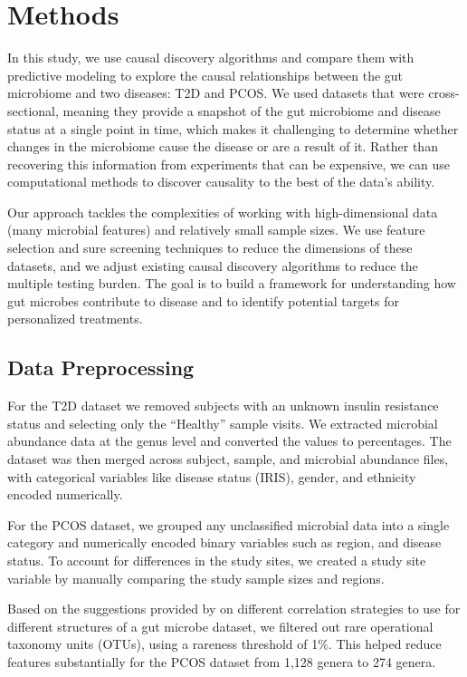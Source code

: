 \documentclass[12pt,letterpaper]{article}
\begin{document}
\section{Methods}

In this study, we use causal discovery algorithms and compare them with predictive modeling to explore the causal relationships between the gut microbiome and two diseases: T2D and PCOS. We used datasets that were cross-sectional, meaning they provide a snapshot of the gut microbiome and disease status at a single point in time, which makes it challenging to determine whether changes in the microbiome cause the disease or are a result of it. Rather than recovering this information from experiments that can be expensive, we can use computational methods to discover causality to the best of the data’s ability. 

Our approach tackles the complexities of working with high-dimensional data (many microbial features) and relatively small sample sizes. We use feature selection and sure screening techniques to reduce the dimensions of these datasets, and we adjust existing causal discovery algorithms to reduce the multiple testing burden. The goal is to build a framework for understanding how gut microbes contribute to disease and to identify potential targets for personalized treatments.  

\subsection{Data Preprocessing}

For the T2D dataset we removed subjects with an unknown insulin resistance status and selecting only the “Healthy” sample visits. We extracted microbial abundance data at the genus level and converted the values to percentages. The dataset was then merged across subject, sample, and microbial abundance files, with categorical variables like disease status (IRIS), gender, and ethnicity encoded numerically.

For the PCOS dataset, we grouped any unclassified microbial data into a single category and numerically encoded binary variables such as region, and disease status. To account for differences in the study sites, we created a study site variable by manually comparing the study sample sizes and regions.

Based on the suggestions provided by \citep{weiss2016correlationbenchmark} on different correlation strategies to use for different structures of a gut microbe dataset, we filtered out rare operational taxonomy units (OTUs), using a rareness threshold of 1\%. This helped reduce features substantially for the PCOS dataset from 1,128 genera to 274 genera. 
\end{document}
